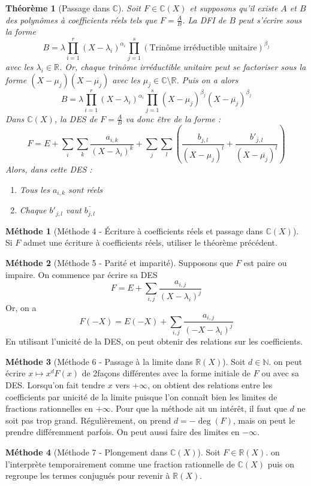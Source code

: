 \documentclass[french]{book}
\newcommand{\N}{\mathbb{N}}
\newcommand{\R}{\mathbb{R}}
\newcommand{\C}{\mathbb{C}}
\theoremstyle{plain}
\newtheorem{thm}{Théorème}[chapter]
\theoremstyle{definition}
\newtheorem{met}{Méthode}[chapter]
\theoremstyle{remark}
\begin{document}
\begin{thm}[Passage dans $\C$]
	Soit $F\in\C(X)$ et supposons qu'il existe $A$ et $B$ des polynômes à coefficients réels tels que $\displaystyle F=\frac{A}{B}$. La DFI de $B$ peut s'écrire sous la forme $$B=\lambda\prod_{i=1}^{r}(X-\lambda_i)^{\alpha_i}\prod_{j=1}^{s}(\text{Trinôme irréductible unitaire})^{\beta_j}$$ avec les $\lambda_i\in\R$. Or, chaque trinôme irréductible unitaire peut se factoriser sous la forme $(X-\mu_j)(X-\overline{\mu_j})$ avec les $\mu_j\in\C\setminus\R$. Puis on a alors $$B=\lambda\prod_{i=1}^{r}(X-\lambda_i)^{\alpha_i}\prod_{j=1}^{s}(X-\mu_j)^{\beta_j}(X-\overline{\mu_j})^{\beta_j}$$ Dans $\C(X)$, la DES de $\displaystyle F=\frac{A}{B}$ va donc être de la forme : $$F=E+\sum_i\sum_k\frac{a_{i,k}}{(X-\lambda_i)^k}+\sum_j\sum_l\left(\frac{b_{j,l}}{(X-\mu_j)^l}+\frac{b'_{j,l}}{(X-\overline{\mu_j})^l}\right)$$ Alors, dans cette DES :
	\begin{enumerate}
		\item Tous les $a_{i,k}$ sont réels
		\item Chaque $b'_{j,l}$ vaut $\overline{b_{j,l}}$
	\end{enumerate}
\end{thm}
\begin{met}[Méthode 4 - Écriture à coefficients réels et passage dans $\C(X)$]
	Si $F$ admet une écriture à coefficients réels, utiliser le théorème précédent.
\end{met}
\begin{met}[Méthode 5 - Parité et imparité]
	Supposons que $F$  est paire ou impaire. On commence par écrire sa DES $$F=E+\sum_{i,j}\frac{a_{i,j}}{(X-\lambda_i)^j}$$ Or, on a $$F(-X)=E(-X)+\sum_{i,j}\frac{a_{i,j}}{(-X-\lambda_i)^j}$$ En utilisant l'unicité de la DES, on peut obtenir des relations sur les coefficients.
\end{met}
\begin{met}[Méthode 6 - Passage à la limite dans $\R(X)$]
	Soit $d\in\N$. on peut écrire $x\mapsto x^dF(x)$ de 2façons différentes avec la forme initiale de $F$ ou avec sa DES. Lorsqu'on fait tendre $x$ vers $+\infty$, on obtient des relations entre les coefficients par unicité de la limite puisque l'on connaît bien les limites de fractions rationnelles en $+\infty$. Pour que la méthode ait un intérêt, il faut que $d$ ne soit pas trop grand. Régulièrement, on prend $d=-\deg(F)$, mais on peut le prendre différemment parfois. On peut aussi faire des limites en $-\infty$.
\end{met}
\begin{met}[Méthode 7 - Plongement dans $\C(X)$]
	Soit $F\in\R(X)$. on l'interprète temporairement comme une fraction rationnelle de $\C(X)$ puis on regroupe les termes conjugués pour revenir à $\R(X)$.
\end{met}
\end{document}
